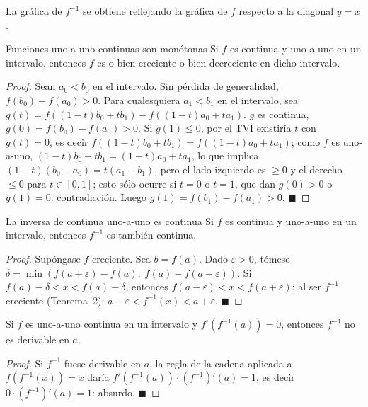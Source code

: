 \documentclass[12pt]{article}
\begin{document}
\begin{nota}[]{}
La gráfica de $f^{-1}$ se obtiene reflejando la gráfica de $f$ respecto a la diagonal $y = x$.
\end{nota}

\begin{teorema}[2]{Funciones uno-a-uno continuas son monótonas}
Si $f$ es continua y uno-a-uno en un intervalo, entonces $f$ es o bien creciente o bien decreciente en dicho intervalo.
\end{teorema}

\begin{proof}
Sean $a_0 < b_0$ en el intervalo. Sin pérdida de generalidad, $f(b_0)-f(a_0)>0$. Para cualesquiera $a_1 < b_1$ en el intervalo, sea $g(t) = f((1-t)b_0 + tb_1) - f((1-t)a_0 + ta_1)$. $g$ es continua, $g(0) = f(b_0)-f(a_0) > 0$. Si $g(1) \leq 0$, por el TVI existiría $t$ con $g(t)=0$, es decir $f((1-t)b_0+tb_1)=f((1-t)a_0+ta_1)$; como $f$ es uno-a-uno, $(1-t)b_0+tb_1 = (1-t)a_0+ta_1$, lo que implica $(1-t)(b_0-a_0) = t(a_1-b_1)$, pero el lado izquierdo es $\geq 0$ y el derecho $\leq 0$ para $t \in [0,1]$; esto sólo ocurre si $t=0$ o $t=1$, que dan $g(0)>0$ o $g(1)=0$: contradicción. Luego $g(1) = f(b_1)-f(a_1) > 0$.
$\blacksquare$
\end{proof}

\begin{teorema}[3]{La inversa de continua uno-a-uno es continua}
Si $f$ es continua y uno-a-uno en un intervalo, entonces $f^{-1}$ es también continua.
\end{teorema}

\begin{proof}
Supóngase $f$ creciente. Sea $b = f(a)$. Dado $\varepsilon > 0$, tómese $\delta = \min(f(a+\varepsilon)-f(a),\; f(a)-f(a-\varepsilon))$. Si $f(a)-\delta < x < f(a)+\delta$, entonces $f(a-\varepsilon) < x < f(a+\varepsilon)$; al ser $f^{-1}$ creciente (Teorema~2): $a-\varepsilon < f^{-1}(x) < a+\varepsilon$.
$\blacksquare$
\end{proof}

\begin{teorema}[4]{}
Si $f$ es uno-a-uno continua en un intervalo y $f'(f^{-1}(a)) = 0$, entonces $f^{-1}$ no es derivable en $a$.
\end{teorema}

\begin{proof}
Si $f^{-1}$ fuese derivable en $a$, la regla de la cadena aplicada a $f(f^{-1}(x))=x$ daría $f'(f^{-1}(a))\cdot(f^{-1})'(a) = 1$, es decir $0\cdot(f^{-1})'(a)=1$: absurdo.
$\blacksquare$
\end{proof}
\end{document}
